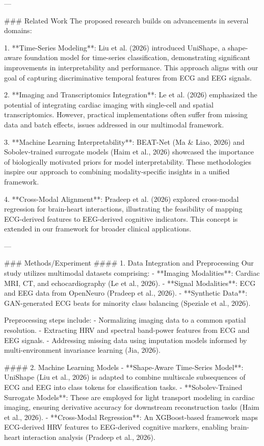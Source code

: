 ---

### Related Work  
The proposed research builds on advancements in several domains:  

1. **Time-Series Modeling**: Liu et al. (2026) introduced UniShape, a shape-aware foundation model for time-series classification, demonstrating significant improvements in interpretability and performance. This approach aligns with our goal of capturing discriminative temporal features from ECG and EEG signals.

2. **Imaging and Transcriptomics Integration**: Le et al. (2026) emphasized the potential of integrating cardiac imaging with single-cell and spatial transcriptomics. However, practical implementations often suffer from missing data and batch effects, issues addressed in our multimodal framework.

3. **Machine Learning Interpretability**: BEAT-Net (Ma & Liao, 2026) and Sobolev-trained surrogate models (Haim et al., 2026) showcased the importance of biologically motivated priors for model interpretability. These methodologies inspire our approach to combining modality-specific insights in a unified framework.

4. **Cross-Modal Alignment**: Pradeep et al. (2026) explored cross-modal regression for brain-heart interactions, illustrating the feasibility of mapping ECG-derived features to EEG-derived cognitive indicators. This concept is extended in our framework for broader clinical applications.

---

### Methods/Experiment  
#### 1. Data Integration and Preprocessing  
Our study utilizes multimodal datasets comprising:  
- **Imaging Modalities**: Cardiac MRI, CT, and echocardiography (Le et al., 2026).  
- **Signal Modalities**: ECG and EEG data from OpenNeuro (Pradeep et al., 2026).  
- **Synthetic Data**: GAN-generated ECG beats for minority class balancing (Speziale et al., 2026).  

Preprocessing steps include:  
- Normalizing imaging data to a common spatial resolution.  
- Extracting HRV and spectral band-power features from ECG and EEG signals.  
- Addressing missing data using imputation models informed by multi-environment invariance learning (Jia, 2026).

#### 2. Machine Learning Models  
- **Shape-Aware Time-Series Model**: UniShape (Liu et al., 2026) is adapted to combine multiscale subsequences of ECG and EEG into class tokens for classification tasks.  
- **Sobolev-Trained Surrogate Models**: These are employed for light transport modeling in cardiac imaging, ensuring derivative accuracy for downstream reconstruction tasks (Haim et al., 2026).  
- **Cross-Modal Regression**: An XGBoost-based framework maps ECG-derived HRV features to EEG-derived cognitive markers, enabling brain-heart interaction analysis (Pradeep et al., 2026).


